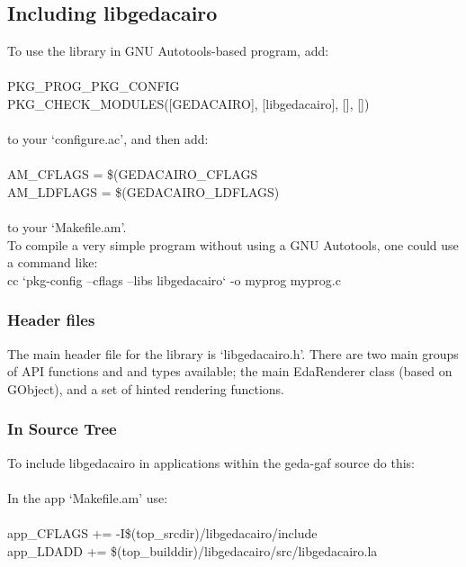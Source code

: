 \subsection*{Including libgedacairo}


  To use the library in GNU Autotools-based program, add: \\ 
\\ 
 PKG\_PROG\_PKG\_CONFIG\\ 
 PKG\_CHECK\_MODULES([GEDACAIRO], [libgedacairo], [], [])\\ 
\\ 
 to your `configure.ac', and then add: \\ 
\\ 
 AM\_CFLAGS = \$(GEDACAIRO\_CFLAGS\\ 
 AM\_LDFLAGS = \$(GEDACAIRO\_LDFLAGS)\\ 
\\ 
 to your `Makefile.am'.\\ 



  To compile a very simple program without using a GNU Autotools, one could use a command like:\\ 

cc `pkg-config --cflags --libs libgedacairo` -o myprog myprog.c
\subsubsection*{Header files}
 The main header file for the library is `libgedacairo.h'. There are two main groups of API functions and and types available; the main EdaRenderer class (based on GObject), and a set of hinted rendering functions. 
\subsubsection*{In Source Tree}
 To include libgedacairo in applications within the geda-gaf source do this:\\ 
\\ 
 In the app `Makefile.am' use:\\ 
\\ 
app\_CFLAGS += -I\$(top\_srcdir)/libgedacairo/include
\\ 
app\_LDADD += \$(top\_builddir)/libgedacairo/src/libgedacairo.la



